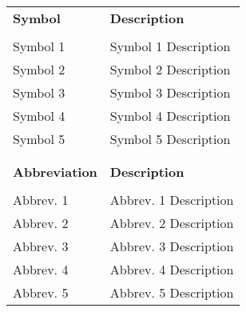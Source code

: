 
    \begin{longtable}{ p{1.5in} p{3.75in} }
 {\large \textbf{Symbol}} & {\large \textbf{Description}}\\
                &\\
 Symbol 1       & Symbol 1 Description\\
 Symbol 2       & Symbol 2 Description\\
 Symbol 3       & Symbol 3 Description\\
 Symbol 4       & Symbol 4 Description\\
 Symbol 5       & Symbol 5 Description\\
                &\\
                &\\
 {\large \textbf{Abbreviation}} & {\large \textbf{Description}}\\
                &\\
 Abbrev. 1      & Abbrev. 1 Description\\
 Abbrev. 2      & Abbrev. 2 Description\\
 Abbrev. 3      & Abbrev. 3 Description\\
 Abbrev. 4      & Abbrev. 4 Description\\
 Abbrev. 5      & Abbrev. 5 Description
\end{longtable}


